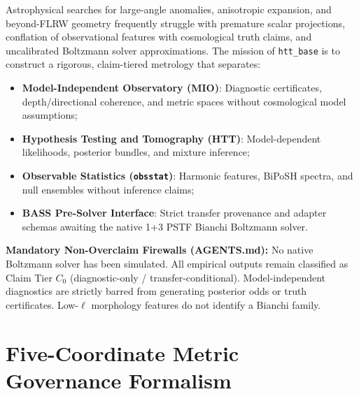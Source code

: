 \documentclass[11pt,a4paper]{article}
\begin{document}
Astrophysical searches for large-angle anomalies, anisotropic expansion, and beyond-FLRW geometry frequently struggle with premature scalar projections, conflation of observational features with cosmological truth claims, and uncalibrated Boltzmann solver approximations. The mission of \texttt{htt\_base} is to construct a rigorous, claim-tiered metrology that separates:
\begin{itemize}
    \item \textbf{Model-Independent Observatory (MIO)}: Diagnostic certificates, depth/directional coherence, and metric spaces without cosmological model assumptions;
    \item \textbf{Hypothesis Testing and Tomography (HTT)}: Model-dependent likelihoods, posterior bundles, and mixture inference;
    \item \textbf{Observable Statistics (\texttt{obsstat})}: Harmonic features, BiPoSH spectra, and null ensembles without inference claims;
    \item \textbf{BASS Pre-Solver Interface}: Strict transfer provenance and adapter schemas awaiting the native 1+3 PSTF Bianchi Boltzmann solver.
\end{itemize}

\noindent
\textbf{Mandatory Non-Overclaim Firewalls (AGENTS.md):}
No native Boltzmann solver has been simulated. All empirical outputs remain classified as Claim Tier $C_0$ (diagnostic-only / transfer-conditional). Model-independent diagnostics are strictly barred from generating posterior odds or truth certificates. Low-$\ell$ morphology features do not identify a Bianchi family.

\section{Five-Coordinate Metric Governance Formalism}
\end{document}
